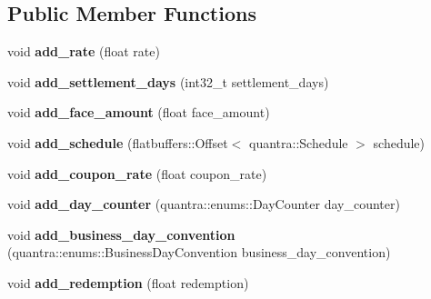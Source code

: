 \subsection*{Public Member Functions}
\begin{DoxyCompactItemize}
\item 
\mbox{\label{structquantra_1_1BondHelperBuilder_ab2267d8aaaba80893bb822457ada79ed}} 
void {\bfseries add\+\_\+rate} (float rate)
\item 
\mbox{\label{structquantra_1_1BondHelperBuilder_ad56ea9446a52c7ace89b9ffd45d1d8f9}} 
void {\bfseries add\+\_\+settlement\+\_\+days} (int32\+\_\+t settlement\+\_\+days)
\item 
\mbox{\label{structquantra_1_1BondHelperBuilder_a7f0b2c3cb76d81e36641ed723ee27bc4}} 
void {\bfseries add\+\_\+face\+\_\+amount} (float face\+\_\+amount)
\item 
\mbox{\label{structquantra_1_1BondHelperBuilder_acf37834d938dc1c7fd5d89aff2b58133}} 
void {\bfseries add\+\_\+schedule} (flatbuffers\+::\+Offset$<$ quantra\+::\+Schedule $>$ schedule)
\item 
\mbox{\label{structquantra_1_1BondHelperBuilder_a35fe6149591c32a449bb873e760b407d}} 
void {\bfseries add\+\_\+coupon\+\_\+rate} (float coupon\+\_\+rate)
\item 
\mbox{\label{structquantra_1_1BondHelperBuilder_a172d5f647cc500c9a45ac77b5169e278}} 
void {\bfseries add\+\_\+day\+\_\+counter} (quantra\+::enums\+::\+Day\+Counter day\+\_\+counter)
\item 
\mbox{\label{structquantra_1_1BondHelperBuilder_a03ea913012244ae92b2be3520bc1b56f}} 
void {\bfseries add\+\_\+business\+\_\+day\+\_\+convention} (quantra\+::enums\+::\+Business\+Day\+Convention business\+\_\+day\+\_\+convention)
\item 
\mbox{\label{structquantra_1_1BondHelperBuilder_a89d1b8c05ddb74045fa1e856f9a57c58}} 
void {\bfseries add\+\_\+redemption} (float redemption)

\end{DoxyCompactItemize}
